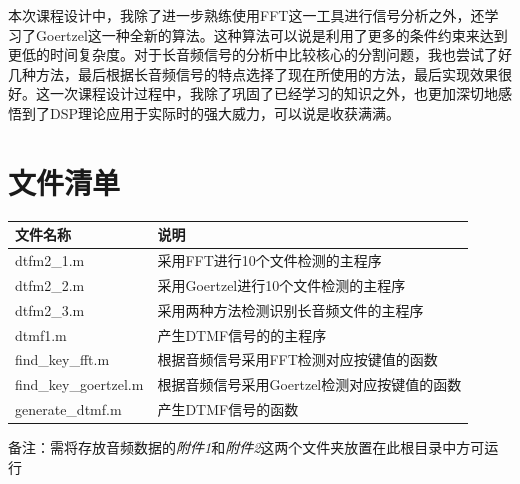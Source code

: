 \documentclass[10pt, a4paper]{article}
\begin{document}
本次课程设计中，我除了进一步熟练使用FFT这一工具进行信号分析之外，还学习了Goertzel这一种全新的算法。这种算法可以说是利用了更多的条件约束来达到更低的时间复杂度。对于长音频信号的分析中比较核心的分割问题，我也尝试了好几种方法，最后根据长音频信号的特点选择了现在所使用的方法，最后实现效果很好。这一次课程设计过程中，我除了巩固了已经学习的知识之外，也更加深切地感悟到了DSP理论应用于实际时的强大威力，可以说是收获满满。

\clearpage
\section{文件清单}

\begin{table}[h]
    \centering
    \begin{tabular}{ll}
        \toprule
        文件名称         & 说明                       \\
        \midrule
        dtfm2\_1.m           & 采用FFT进行10个文件检测的主程序 \\
        dtfm2\_2.m           & 采用Goertzel进行10个文件检测的主程序 \\
        dtfm2\_3.m           & 采用两种方法检测识别长音频文件的主程序 \\
        dtmf1.m             & 产生DTMF信号的的主程序 \\
        find\_key\_fft.m      & 根据音频信号采用FFT检测对应按键值的函数 \\
        find\_key\_goertzel.m & 根据音频信号采用Goertzel检测对应按键值的函数 \\
        generate\_dtmf.m     & 产生DTMF信号的函数 \\
        \bottomrule
    \end{tabular}
\end{table}

备注：需将存放音频数据的\textit{附件1}和\textit{附件2}这两个文件夹放置在此根目录中方可运行
\end{document}
